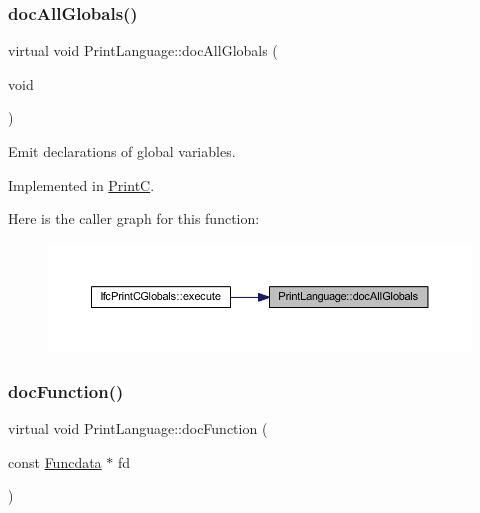 \subsubsection{\texorpdfstring{docAllGlobals()}{docAllGlobals()}}
{\footnotesize\ttfamily virtual void Print\+Language\+::doc\+All\+Globals (\begin{DoxyParamCaption}\item[{void}]{ }\end{DoxyParamCaption})\hspace{0.3cm}{\ttfamily [pure virtual]}}



Emit declarations of global variables. 



Implemented in \mbox{\hyperlink{class_print_c_a3ba75e33a923a30e5fe29b8201855749}{PrintC}}.

Here is the caller graph for this function\+:
\nopagebreak
\begin{figure}[H]
\begin{center}
\leavevmode
\includegraphics[width=350pt]{class_print_language_a3fbbabf7a0a2f67e02b49d895db04fa9_icgraph}
\end{center}
\end{figure}
\mbox{\label{class_print_language_a93ebbf4cf20c65236ffca078fd5cbc21}} 
\subsubsection{\texorpdfstring{docFunction()}{docFunction()}}
{\footnotesize\ttfamily virtual void Print\+Language\+::doc\+Function (\begin{DoxyParamCaption}\item[{const \mbox{\hyperlink{class_funcdata}{Funcdata}} $\ast$}]{fd }\end{DoxyParamCaption})\hspace{0.3cm}{\ttfamily [pure virtual]}}



